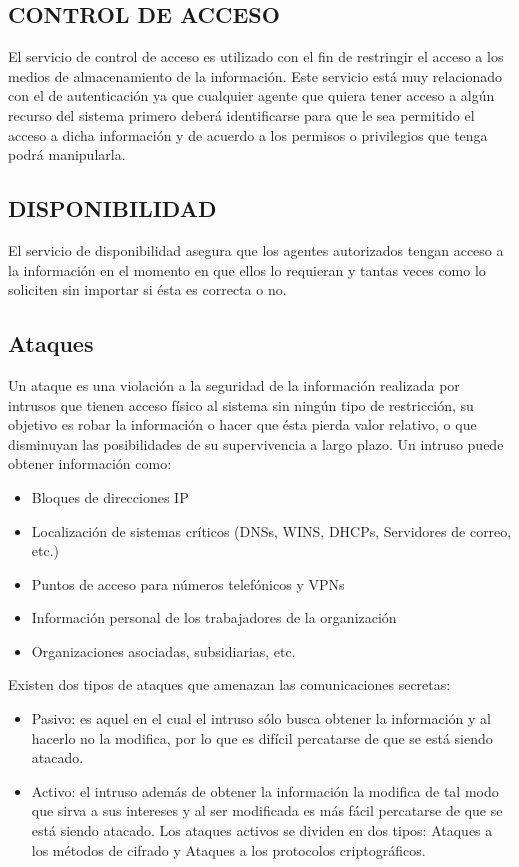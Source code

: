 \subsection{CONTROL DE ACCESO}
El servicio de control de acceso es utilizado con el fin de restringir el acceso a los medios de almacenamiento de la información. Este servicio está muy relacionado con el de autenticación ya que cualquier agente que quiera tener acceso a algún recurso del sistema primero deberá identificarse para que le sea permitido el acceso a dicha información y de acuerdo a los permisos o privilegios que tenga podrá manipularla.

\subsection{DISPONIBILIDAD}
El servicio de disponibilidad asegura que los agentes autorizados tengan acceso a la información en el momento en que ellos lo requieran y tantas veces como lo soliciten sin importar si ésta es correcta o no.

\subsection{Ataques}
Un ataque es una violación a la seguridad de la información realizada por intrusos que tienen acceso físico al sistema sin ningún tipo de restricción, su objetivo es robar la información o hacer que ésta pierda valor relativo, o que disminuyan las posibilidades de su supervivencia a largo plazo.
Un intruso puede obtener información como:
\begin{itemize}
	\item Bloques de direcciones IP
	\item Localización de sistemas críticos (DNSs, WINS, DHCPs, Servidores de correo, etc.)
	\item Puntos de acceso para números telefónicos y VPNs
	\item Información personal de los trabajadores de la organización
	\item Organizaciones asociadas, subsidiarias, etc.
\end{itemize}
Existen dos tipos de ataques que amenazan las comunicaciones secretas:
\begin{itemize}
	\item Pasivo: es aquel en el cual el intruso sólo busca obtener la información y al hacerlo no la modifica, por lo que es difícil percatarse de que se está siendo atacado.
	\item Activo: el intruso además de obtener la información la modifica de tal modo que sirva a sus intereses y al ser modificada es más fácil percatarse de que se está siendo atacado.
Los ataques activos se dividen en dos tipos: Ataques a los métodos de cifrado y Ataques a los protocolos criptográficos.
\end{itemize}

